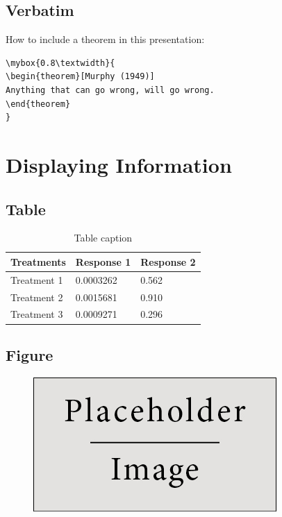 \documentclass[
paper=landscape,
paper=160mm:90mm, %
fontsize=11pt, %
pagesize, %
parskip=half-, %
]{scrartcl} %
\theoremstyle{mythmstyle} %
\newtheorem{theorem}{Theorem}[section] %
\newcommand*{\mybox}[2]{ %
\par\noindent
\begin{tikzpicture}[mynodestyle/.style={rectangle,draw=mygreen,thick,inner sep=2mm,text justified,top color=white,bottom color=white,above}]\node[mynodestyle,at={(0.5*#1+2mm+0.4pt,0)}]{ %
\begin{minipage}[t]{#1}
#2
\end{minipage}
};
\end{tikzpicture}
\par\vspace{-1.3em}}
\begin{document}
\clearpage


\subsection{Verbatim}

How to include a theorem in this presentation:
\begin{verbatim}
\mybox{0.8\textwidth}{
\begin{theorem}[Murphy (1949)]
Anything that can go wrong, will go wrong.
\end{theorem}
}
\end{verbatim}

\clearpage



\section{Displaying Information}

\clearpage


\subsection{Table}

\begin{table}[h]
\centering
\begin{tabular}{l l l}
\toprule
\textbf{Treatments} & \textbf{Response 1} & \textbf{Response 2}\\
\midrule
Treatment 1 & 0.0003262 & 0.562 \\
Treatment 2 & 0.0015681 & 0.910 \\
Treatment 3 & 0.0009271 & 0.296 \\
\bottomrule
\end{tabular}
\caption{Table caption}
\end{table}

\clearpage


\subsection{Figure}

\begin{figure}[h]
\centering\includegraphics[width=0.4\linewidth]{placeholder}
\end{figure}
\end{document}

